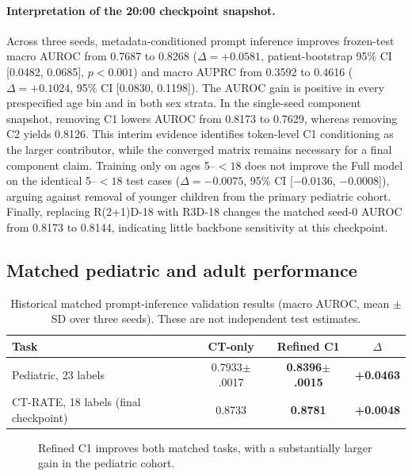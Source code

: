 \documentclass[10pt,twocolumn]{article}
\newcommand{\best}[1]{\textbf{#1}}
\begin{document}
\paragraph{Interpretation of the 20:00 checkpoint snapshot.}
Across three seeds, metadata-conditioned prompt inference improves frozen-test
macro AUROC from 0.7687 to 0.8268 ($\Delta=+0.0581$, patient-bootstrap 95\%
CI [0.0482, 0.0685], $p<0.001$) and macro AUPRC from 0.3592 to 0.4616
($\Delta=+0.1024$, 95\% CI [0.0830, 0.1198]). The AUROC gain is positive
in every prespecified age bin and in both sex strata. In the single-seed
component snapshot, removing C1 lowers AUROC from 0.8173 to 0.7629, whereas
removing C2 yields 0.8126. This interim evidence identifies token-level C1
conditioning as the larger contributor, while the converged matrix remains
necessary for a final component claim. Training only on ages 5--$<18$ does
not improve the Full model on the identical 5--$<18$ test cases
($\Delta=-0.0075$, 95\% CI [$-0.0136$, $-0.0008$]), arguing against removal
of younger children from the primary pediatric cohort. Finally, replacing
R(2+1)D-18 with R3D-18 changes the matched seed-0 AUROC from 0.8173 to 0.8144,
indicating little backbone sensitivity at this checkpoint.
\subsection{Matched pediatric and adult performance}

\begin{table}[t]
\centering
\caption{Historical matched prompt-inference validation results (macro AUROC,
mean $\pm$ SD over three seeds). These are not independent test estimates.}
\label{tab:main}
\begin{tabular}{@{}lccc@{}}
\toprule
Task & CT-only & Refined C1 & $\Delta$ \\
\midrule
Pediatric, 23 labels & 0.7933$\pm$.0017 & \best{0.8396$\pm$.0015} & \best{+0.0463} \\
CT-RATE, 18 labels (final checkpoint) & 0.8733 & \best{0.8781} & \best{+0.0048} \\
\bottomrule
\end{tabular}
\end{table}

\begin{figure}[t]
\centering
{}
\caption{Refined C1 improves both matched tasks, with a substantially larger
gain in the pediatric cohort.}
\label{fig:mainbars}
\end{figure}
\end{document}
